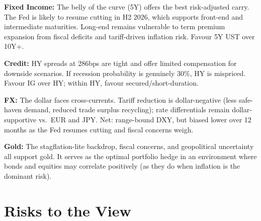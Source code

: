 \documentclass{wilson-report}
\begin{document}
\textbf{Fixed Income:} The belly of the curve (5Y) offers the best risk-adjusted carry. The Fed is likely to resume cutting in H2 2026, which supports front-end and intermediate maturities. Long-end remains vulnerable to term premium expansion from fiscal deficits and tariff-driven inflation risk. Favour 5Y UST over 10Y+.

\textbf{Credit:} HY spreads at 286bps are tight and offer limited compensation for downside scenarios. If recession probability is genuinely 30\%, HY is mispriced. Favour IG over HY; within HY, favour secured/short-duration.

\textbf{FX:} The dollar faces cross-currents. Tariff reduction is dollar-negative (less safe-haven demand, reduced trade surplus recycling); rate differentials remain dollar-supportive vs.\ EUR and JPY. Net: range-bound DXY, but biased lower over 12 months as the Fed resumes cutting and fiscal concerns weigh.

\textbf{Gold:} The stagflation-lite backdrop, fiscal concerns, and geopolitical uncertainty all support gold. It serves as the optimal portfolio hedge in an environment where bonds and equities may correlate positively (as they do when inflation is the dominant risk).

\section{Risks to the View}
\end{document}
